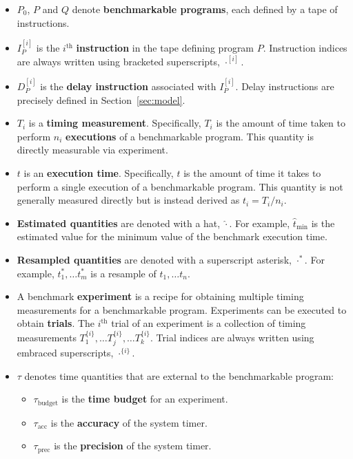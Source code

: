 \documentclass[conference]{IEEEtran}
\begin{document}
\begin{itemize}
    \item
    $P_0$, $P$ and $Q$ denote \textbf{benchmarkable programs}, each defined by a tape of
    instructions.

    \item
    $I^{[i]}_{P}$ is the $i^{\textrm{th}}$ \textbf{instruction} in the tape defining program $P$.
    Instruction indices are always written using bracketed superscripts, $\cdot^{[i]}$.

    \item
    $D^{[i]}_{P}$ is the \textbf{delay instruction} associated with $I^{[i]}_{P}$. Delay
    instructions are precisely defined in Section~\ref{sec:model}.

    \item
    $T_i$ is a \textbf{timing measurement}. Specifically, $T_i$ is the amount of time taken
    to perform $n_i$ \textbf{executions} of a benchmarkable program. This quantity is
    directly measurable via experiment.

    \item
    $t$ is an \textbf{execution time}. Specifically, $t$ is the amount of time it takes to
    perform a single execution of a benchmarkable program. This quantity is not generally
    measured directly but is instead derived as $t_i = T_i / n_i$.

    \item
    \textbf{Estimated quantities} are denoted with a hat, $\hat\cdot$. For example,
    $\hat{t}_{\textrm{min}}$ is the estimated value for the minimum value of the benchmark execution
    time.

    \item
    \textbf{Resampled quantities} are denoted with a superscript asterisk, $\cdot^*$. For
    example, $t^*_1, \dots t^*_m$ is a resample of $t_1, \dots t_n$.

    \item
    A benchmark \textbf{experiment} is a recipe for obtaining multiple timing measurements
    for a benchmarkable program. Experiments can be executed to obtain \textbf{trials}. The
    $i^{\textrm{th}}$ trial of an experiment is a collection of timing measurements
    $T^{\{i\}}_1, \dots T^{\{i\}}_j, \dots T^{\{i\}}_k$. Trial indices are always
    written using embraced superscripts, $\cdot^{\{i\}}$.

    \item
    $\tau$ denotes time quantities that are external to the benchmarkable program:
    \begin{itemize}
        \item $\tau_{\textrm{budget}}$ is the \textbf{time budget} for an experiment.
        \item $\tau_{\textrm{acc}}$ is the \textbf{accuracy} of the system timer.
        \item $\tau_{\textrm{prec}}$ is the \textbf{precision} of the system timer.
    \end{itemize}


\end{itemize}
\end{document}
